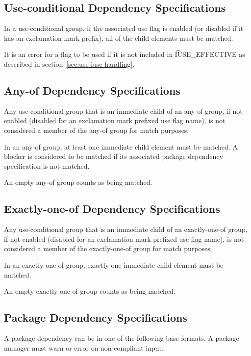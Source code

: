 \subsection{Use-conditional Dependency Specifications}

In a use-conditional group, if the associated use flag is enabled (or disabled if it has an
exclamation mark prefix), all of the child elements must be matched.

It is an error for a flag to be used if it is not included in \t{IUSE\_EFFECTIVE} as described in
section~\ref{sec:use-iuse-handling}.

\subsection{Any-of Dependency Specifications}

Any use-conditional group that is an immediate child of an any-of group, if not enabled (disabled
for an exclamation mark prefixed use flag name), is not considered a member of the any-of group
for match purposes.

In an any-of group, at least one immediate child element must be matched. A blocker is
considered to be matched if its associated package dependency specification is not matched.

An empty any-of group counts as being matched.

\subsection{Exactly-one-of Dependency Specifications}

Any use-conditional group that is an immediate child of an exactly-one-of group, if not enabled
(disabled for an exclamation mark prefixed use flag name), is not considered a member of the
exactly-one-of group for match purposes.

In an exactly-one-of group, exactly one immediate child element must be matched.

An empty exactly-one-of group counts as being matched.

\subsection{Package Dependency Specifications}

A package dependency can be in one of the following base formats. A package manager must warn or
error on non-compliant input.


